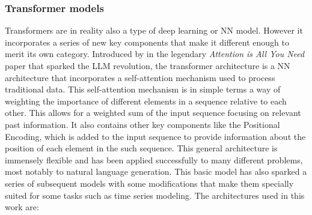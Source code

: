 \subsubsection{Transformer models}
Transformers are in reality also a type of deep learning or NN model. However it incorporates a series of new key components that make it different enough to merit its own category. Introduced by \cite{vaswani_2017} in the legendary \textit{Attention is All You Need} paper that sparked the LLM revolution, the transformer architecture is a NN architecture that incorporates a self-attention mechanism used to process traditional data. This self-attention mechanism is in simple terms a way of weighting the importance of different elements in a sequence relative to each other. This allows for a weighted sum of the input sequence focusing on relevant past information. It also contains other key components like the Positional Encoding, which is added to the input sequence to provide information about the position of each element in the such sequence. This general architecture is immensely flexible and has been applied successfully to many different problems, most notably to natural language generation. This basic model has also sparked a series of subsequent models with some modifications that make them specially suited for some tasks such as time series modeling. The architectures used in this work are:
